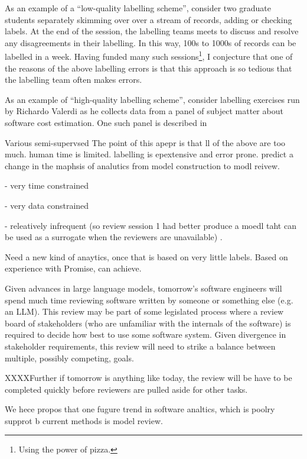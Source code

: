 As an example of a ``low-quality labelling scheme'', consider  two graduate students 
 separately skimming over  over  a stream of records,   adding or checking labels.   At the end of the session, the labelling teams meets to discuss and resolve any  disagreements in their labelling. In this way, 100s to 1000s of records can be labelled in a week. Having funded many such sessions\footnote{Using the power of pizza.}, I conjecture that one of the reasons of the above labelling errors is that this approach is so tedious that the labelling team often makes errors.  

 As an example of ``high-quality labelling scheme'', consider labelling exercises run by Richardo Valerdi as he collects data from a panel of subject matter about software cost estimation. One such
 panel is described in 

 

Various semi-supervsed
The point of this apepr is that ll of the above are too much. human time is limited. labelling is epextensive and error prone. predict a change in the maphsis of analutics from model construction to modl reivew.

- very time constrained

- very data constrained

- releatively infrequent (so review session 1 had better produce a moedl taht can be used as a surrogate when the  reviewers are 
unavailable) .

Need a new kind of anaytics, once that is based on very little labels. Based on experience with Promise, can achieve.



Given advances in large language models, 
tomorrow's software engineers will spend much time reviewing  software written by someone or something else (e.g. an LLM).  This review may be part of some legislated  process where a review board of stakeholders (who are unfamiliar with the internals of the software) is  required to decide how best to use some software system.
Given   divergence in stakeholder requirements, this review   will need  to strike a balance between multiple, possibly competing, goals.

XXXXFurther if tomorrow is anything like today, the  review    will be have to be completed quickly before     reviewers are pulled 
aside for  other tasks.

We hece propos that one fugure trend in software analtics,
which is poolry supprot b current methods is model review.

